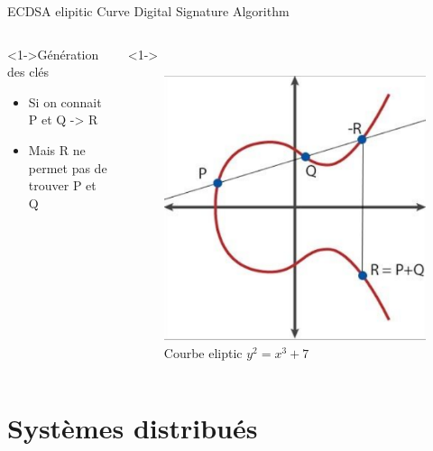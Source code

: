 \documentclass[presentation]{beamer}
\begin{document}
\begin{frame}[label={sec:org48fb07c}]{ECDSA elipitic Curve Digital Signature Algorithm}
\begin{columns}
\begin{column}{0.46\columnwidth}
\begin{block}<1->{Génération des clés}
\begin{itemize}
\item Si on connait P et Q -> R
\item Mais R ne permet pas de trouver P et Q
\end{itemize}
\end{block}
\end{column}

\begin{column}{0.46\columnwidth}
\begin{block}<1->{}
\begin{figure}[htbp]
\centering
\includegraphics[width=.8\textwidth]{Images/eliptic.png}
\caption{Courbe eliptic \(y^2 = x^3 +7\)}
\end{figure}
\end{block}
\end{column}
\end{columns}
\end{frame}



\section{Systèmes distribués}
\label{sec:org5091e83}
\end{document}
